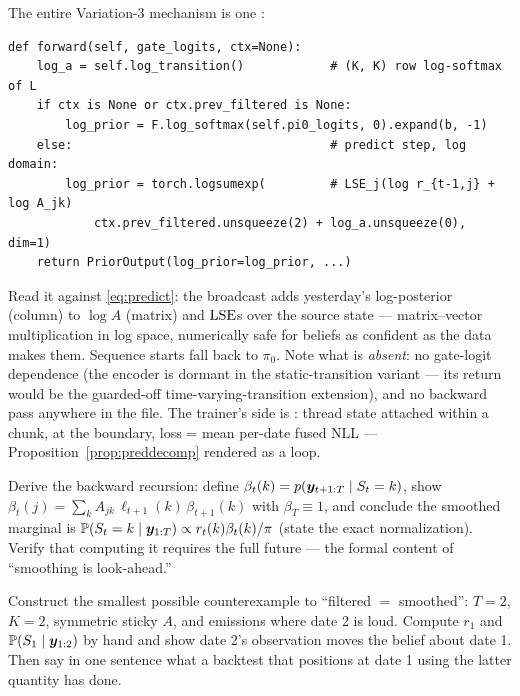 \begin{codewalk}
The entire Variation-3 mechanism is one :
\begin{lstlisting}
def forward(self, gate_logits, ctx=None):
    log_a = self.log_transition()            # (K, K) row log-softmax of L
    if ctx is None or ctx.prev_filtered is None:
        log_prior = F.log_softmax(self.pi0_logits, 0).expand(b, -1)
    else:                                    # predict step, log domain:
        log_prior = torch.logsumexp(         # LSE_j(log r_{t-1,j} + log A_jk)
            ctx.prev_filtered.unsqueeze(2) + log_a.unsqueeze(0), dim=1)
    return PriorOutput(log_prior=log_prior, ...)
\end{lstlisting}
Read it against \eqref{eq:predict}: the broadcast adds yesterday's
log-posterior (column) to $\log A$ (matrix) and $\operatorname{LSE}$s over the source
state --- matrix--vector multiplication in log space, numerically safe
for beliefs as confident as the data makes them. Sequence starts fall
back to $\pi_0$. Note what is \emph{absent}: no gate-logit dependence
(the encoder is dormant in the static-transition variant --- its return
would be the guarded-off time-varying-transition extension), and no
backward pass anywhere in the file. The trainer's side is
: thread state attached within a chunk,
 at the boundary, loss = mean per-date fused NLL
--- Proposition~\ref{prop:preddecomp} rendered as a  loop.
\end{codewalk}

\exercisehead

\begin{exercise}\label{ex:7-smoother}
Derive the backward recursion: define $\beta_t(k) = p(\bm{y}_{t+1:T} \mid
S_t = k)$, show $\beta_t(j) = \sum_k A_{jk}\, \ell_{t+1}(k)\,
\beta_{t+1}(k)$ with $\beta_T \equiv 1$, and conclude the smoothed
marginal is $\mathbb{P}(S_t = k \mid \bm{y}_{1:T}) \propto r_t(k)\beta_t(k) /
\pi$ (state the exact normalization). Verify that computing it requires
the full future --- the formal content of ``smoothing is look-ahead.''
\end{exercise}

\begin{exercise}\label{ex:7-counter}
Construct the smallest possible counterexample to ``filtered $=$
smoothed'': $T = 2$, $K = 2$, symmetric sticky $A$, and emissions where
date 2 is loud. Compute $r_1$ and $\mathbb{P}(S_1 \mid \bm{y}_{1:2})$ by hand
and show date 2's observation moves the belief about date 1. Then say
in one sentence what a backtest that positions at date 1 using the
latter quantity has done.
\end{exercise}

